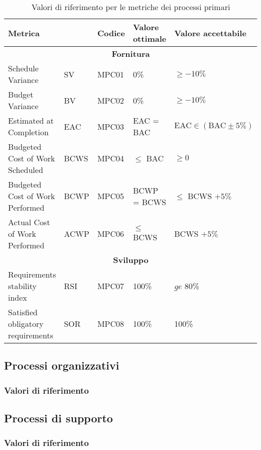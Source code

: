 \begin{table}[H]
    \centering
    \begin{tabularx}{\textwidth}{p{3.5cm}|X|X|l|l}
        \hline
        \multicolumn{2}{l|}{\textbf{Metrica}} & \textbf{Codice}   & \textbf{Valore ottimale}  & \textbf{Valore accettabile}   \\
        \hline
        \multicolumn{5}{c}{\textbf{Fornitura}} \\
        \hline
        Schedule Variance               & SV    & MPC01 & 0\%               & $\ge -10\%$                   \\
        Budget Variance                 & BV    & MPC02 & 0\%               & $\ge -10\%$                   \\
        Estimated at Completion         & EAC   & MPC03 & EAC = BAC         & $\text{EAC} \in (\text{BAC} \pm 5\%)$  \\
        Budgeted Cost of Work Scheduled & BCWS  & MPC04 & $\le$ BAC         & $\ge 0$                       \\
        Budgeted Cost of Work Performed & BCWP  & MPC05 & BCWP = BCWS       & $\le$ BCWS $+ 5\%$            \\
        Actual Cost of Work Performed   & ACWP  & MPC06 & $\le$ BCWS   & BCWS $+ 5\%$                       \\
        \hline
        \multicolumn{5}{c}{\textbf{Sviluppo}} \\
        \hline 
        Requirements stability index    & RSI   & MPC07 & 100\%             & $ge$ 80\%                     \\
        Satisfied obligatory requirements & SOR & MPC08 & 100\%             & 100\%                         \\
        \hline
    \end{tabularx}
    \caption{Valori di riferimento per le metriche dei processi primari}
\end{table}


\subsection{Processi organizzativi}
\subsubsection{Valori di riferimento}
\subsection{Processi di supporto}
\subsubsection{Valori di riferimento}
